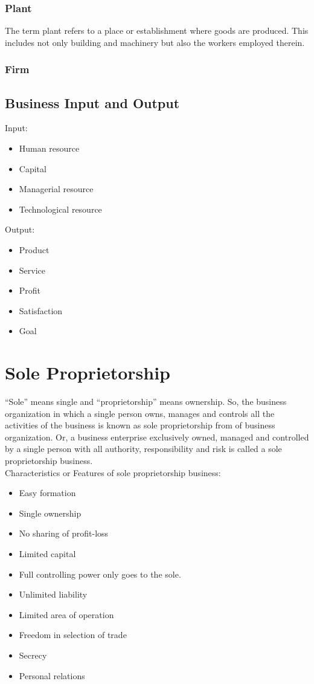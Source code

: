 \documentclass[11pt]{book}
\begin{document}
\subsection{Plant}
The term plant refers to a place or establishment where goods are produced. This includes not only building and machinery but also the workers employed therein.
\subsection{Firm}


\section{Business Input and Output}
Input:
\begin{itemize}
	\item Human resource
	\item Capital
	\item Managerial resource
	\item Technological resource
\end{itemize}
Output:
\begin{itemize}
	\item Product
	\item Service
	\item Profit
	\item Satisfaction
	\item Goal
\end{itemize}

\chapter{Sole Proprietorship}
\enquote{Sole} means single and \enquote{proprietorship} means ownership. So, the business organization in which a single person owns, manages and controls all the activities of the business is known as sole proprietorship from of business organization. Or, a business enterprise exclusively owned, managed and controlled by a single person with all authority, responsibility and risk is called a sole proprietorship business. \\
Characteristics or Features of sole proprietorship business:
\begin{itemize}
	\item Easy formation
	\item Single ownership
	\item No sharing of profit-loss
	\item Limited capital
	\item Full controlling power only goes to the sole.
	\item Unlimited liability
	\item Limited area of operation
	\item Freedom in selection of trade
	\item Secrecy
	\item Personal relations
\end{itemize}
\end{document}
